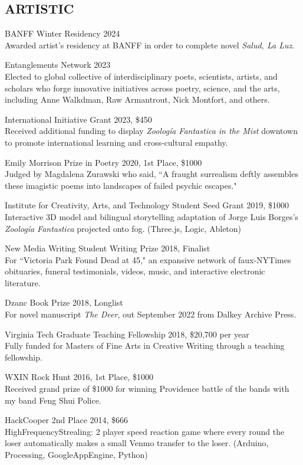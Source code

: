  \subsection{ARTISTIC}
BANFF Winter Residency 2024\\
Awarded artist's residency at BANFF in order to complete novel \emph{Salud, La Luz}.
 
Entanglements Network 2023 \\
 Elected to global collective of interdisciplinary poets, scientists, artists, and scholars who forge innovative initiatives across poetry, science, and the arts, including Anne Walkdman, Raw Armantrout, Nick Montfort, and others. 
 
 International Initiative Grant 2023, \$450  \\
Received additional funding to display \emph{Zoolog\'ia Fantastica in the Mist} downtown to promote international learning and cross-cultural empathy. 

Emily Morrison Prize in Poetry 2020, 1st Place,  \$1000  \\
Judged by Magdalena Zurawski who said, ``A fraught surrealism deftly assembles these imagistic poems into landscapes of failed psychic escapes."
 
 Institute for Creativity, Arts, and Technology Student Seed Grant 2019, \$1000  \\
Interactive 3D model and bilingual storytelling adaptation of Jorge Luis Borges's \emph{Zoolog\'ia Fantastica} projected onto fog. (Three.js, Logic, Ableton)

New Media Writing Student Writing Prize 2018, Finalist\\
For ``Victoria Park Found Dead at 45," an expansive network of faux-NYTimes obituaries, funeral testimonials, videos, music, and interactive electronic literature. 

Dzanc Book Prize 2018, Longlist \\
For novel manuscript \emph{The Deer}, out September 2022 from Dalkey Archive Press.

Virginia Tech Graduate Teaching Fellowship 2018, \$20,700 per year \\
Fully funded for Masters of Fine Arts in Creative Writing through a teaching fellowship.

WXIN Rock Hunt 2016, 1st Place, \$1000  \\
Received grand prize of \$1000 for winning Providence battle of the bands with my band Feng Shui Police.

HackCooper 2nd Place 2014, \$666  \\
HighFrequencyStrealing: 2 player speed reaction game where every round the loser automatically makes a small Venmo transfer to the loser. (Arduino, Processing, GoogleAppEngine, Python)

